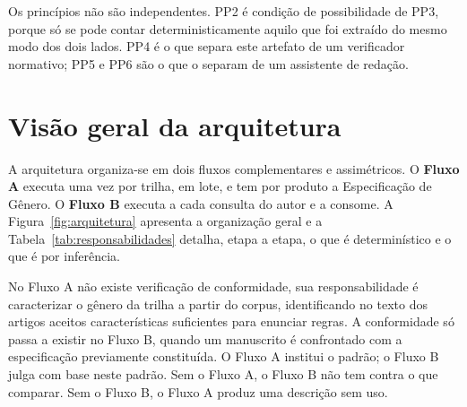 Os princípios não são independentes. PP2 é condição de possibilidade de PP3, porque só se pode contar deterministicamente aquilo que foi extraído do mesmo modo dos dois lados. PP4 é o que separa este artefato de um verificador normativo; PP5 e PP6 são o que o separam de um assistente de redação.


\section{Visão geral da arquitetura}
\label{sec:arquitetura}

A arquitetura organiza-se em dois fluxos complementares e assimétricos. O \textbf{Fluxo A} executa uma vez por trilha, em lote, e tem por produto a Especificação de Gênero. O \textbf{Fluxo B} executa a cada consulta do autor e a consome. A Figura~\ref{fig:arquitetura} apresenta a organização geral e a Tabela~\ref{tab:responsabilidades} detalha, etapa a etapa, o que é determinístico e o que é por inferência.

No Fluxo A não existe verificação de conformidade, sua responsabilidade é caracterizar o gênero da trilha a partir do corpus, identificando no texto dos artigos aceitos características suficientes para enunciar regras. A conformidade só passa a existir no Fluxo B, quando um manuscrito é confrontado com a especificação previamente constituída. O Fluxo A institui o padrão; o Fluxo B julga com base neste padrão. Sem o Fluxo A, o Fluxo B não tem contra o que comparar. Sem o Fluxo B, o Fluxo A produz uma descrição sem uso.

